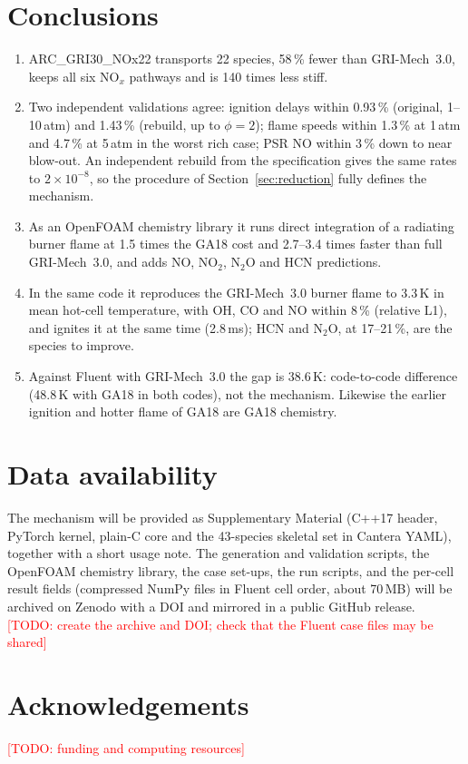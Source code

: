 \documentclass[preprint,review,12pt]{elsarticle}
\providecommand{\todo}[1]{}
\renewcommand{\todo}[1]{\textcolor{red}{[TODO: #1]}}
\newcommand{\ce}[1]{\ensuremath{\mathrm{#1}}}
\begin{document}
\section{Conclusions}
\begin{enumerate}
\item ARC\_GRI30\_NOx22 transports 22 species, 58\,\% fewer than GRI-Mech~3.0, keeps all six NO$_x$ pathways and is
140 times less stiff.
\item Two independent validations agree: ignition delays within 0.93\,\% (original, 1--10\,atm) and 1.43\,\%
(rebuild, up to $\phi=2$); flame speeds within 1.3\,\% at 1\,atm and 4.7\,\% at 5\,atm in the worst rich case; PSR NO
within 3\,\% down to near blow-out. An independent rebuild from the specification gives the same rates to
$2\times10^{-8}$, so the procedure of Section~\ref{sec:reduction} fully defines the mechanism.
\item As an OpenFOAM chemistry library it runs direct integration of a radiating burner flame at 1.5 times the GA18
cost and 2.7--3.4 times faster than full GRI-Mech~3.0, and adds NO, \ce{NO_{2}}, \ce{N_{2}O} and HCN predictions.
\item In the same code it reproduces the GRI-Mech~3.0 burner flame to 3.3\,K in mean hot-cell temperature, with OH,
CO and NO within 8\,\% (relative L1), and ignites it at the same time (2.8\,ms); HCN and \ce{N_{2}O}, at 17--21\,\%, are
the species to improve.
\item Against Fluent with GRI-Mech~3.0 the gap is 38.6\,K: code-to-code difference (48.8\,K with GA18 in both codes),
not the mechanism. Likewise the earlier ignition and hotter flame of GA18 are GA18 chemistry.
\end{enumerate}

\section*{Data availability}
The mechanism will be provided as Supplementary Material (C++17 header, PyTorch kernel, plain-C core and the
43-species skeletal set in Cantera YAML), together with a short usage note. The generation and validation scripts, the
OpenFOAM chemistry library, the case set-ups, the run scripts, and the per-cell result fields (compressed NumPy files
in Fluent cell order, about 70\,MB) will be archived on Zenodo with a DOI and mirrored in a public GitHub release.
\todo{create the archive and DOI; check that the Fluent case files may be shared}

\section*{Acknowledgements}
\todo{funding and computing resources}



\end{document}
